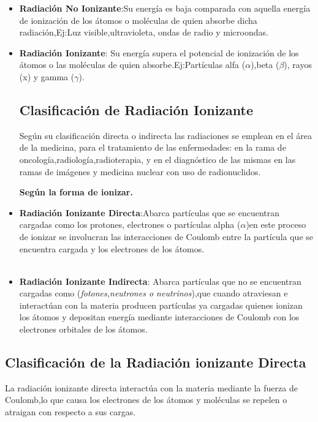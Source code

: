 \documentclass[12pt,fleqn]{book} %
\numberwithin{equation}{section} %
\numberwithin{figure}{section} %
\numberwithin{table}{section} %
\begin{document}
\begin{itemize}
\item \textbf{ Radiación No Ionizante}:Su energía es baja comparada con aquella energía de ionización de los átomos o moléculas de quien absorbe dicha radiación,Ej:Luz visible,ultravioleta, ondas de radio y microondas. 

\item \textbf{ Radiación Ionizante}: Su energía supera el potencial de ionización
de los átomos o las moléculas de quien absorbe.Ej:Partículas alfa ($\alpha$),beta ($\beta$), rayos (x) y gamma ($\gamma$).   



\subsection{Clasificación de  Radiación Ionizante}
Según su clasificación directa o indirecta las radiaciones se emplean en el área de la medicina, para el tratamiento de las enfermedades: en la rama de oncología,radiología,radioterapia, y en el diagnóstico de las mismas en las ramas de imágenes y medicina nuclear con uso de radionuclidos.

 \textbf{Según la forma de ionizar.}%
\item \textbf{ Radiación Ionizante Directa}:Abarca partículas que se encuentran cargadas como los protones, electrones o partículas alpha ($\alpha$)en este proceso de ionizar se involucran las interacciones de Coulomb  entre la partícula que se encuentra cargada y los electrones de los átomos.
\\\\
\item \textbf{ Radiación Ionizante Indirecta}:
 Abarca partículas que no se encuentran cargadas como (\textit{fotones,neutrones o neutrinos}),que cuando atraviesan e interactúan con la materia producen partículas ya cargadas quienes ionizan los átomos y depositan energía  mediante interacciones  de Coulomb con los electrones orbitales de los átomos.
\end{itemize}



\subsection{Clasificación de la Radiación ionizante Directa}
La radiación ionizante directa interactúa con la materia
mediante  la  fuerza  de  Coulomb,lo que causa los electrones de los átomos y moléculas se repelen   o  atraigan
 con respecto a sus cargas.
\end{document}
